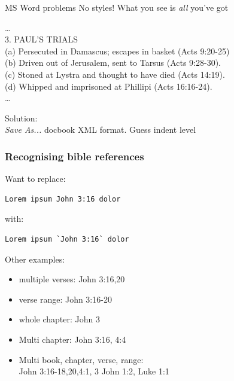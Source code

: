 \documentclass{beamer}
\begin{document}
\begin{frame}{MS Word problems}
No styles! What you see is \emph{all} you've got

    \begin{framed} %
        \ldots\\
3. PAUL'S TRIALS\\
\quad (a) Persecuted in Damascus; escapes in basket (Acts 9:20-25)\\
\quad (b) Driven out of Jerusalem, sent to Tarsus (Acts 9:28-30).\\
\quad (c) Stoned at Lystra and thought to have died (Acts 14:19).\\
\quad (d) Whipped and imprisoned at Phillipi (Acts 16:16-24).\\
\ldots
\end{framed}
Solution:\\
\emph{Save As...} docbook XML format. Guess indent level
\end{frame}

\begin{frame}[fragile]
    \frametitle{Recognising bible references}
     Want to replace:\\
     \begin{verbatim}Lorem ipsum John 3:16 dolor
\end{verbatim}
     with:\\
 \begin{verbatim}Lorem ipsum `John 3:16` dolor
\end{verbatim}
Other examples:
\begin{itemize}
\item multiple verses: John 3:16,20
\item verse range: John 3:16-20
\item whole chapter: John 3
\item Multi chapter: John 3:16, 4:4
\item Multi book, chapter, verse, range:\\
    John 3:16-18,20,4:1, 3 John 1:2, Luke 1:1
\end{itemize}
\end{frame}
\end{document}
